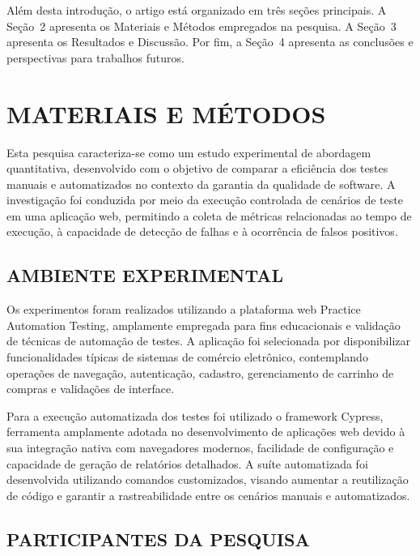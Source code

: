 \documentclass{UNESC}
\begin{document}
Além desta introdução, o artigo está organizado em três seções principais. A Seção~2 apresenta os Materiais e Métodos empregados na pesquisa. A Seção~3 apresenta os Resultados e Discussão. Por fim, a Seção~4 apresenta as conclusões e perspectivas para trabalhos futuros.

\section{MATERIAIS E MÉTODOS}
Esta pesquisa caracteriza-se como um estudo experimental de abordagem quantitativa, desenvolvido com o objetivo de comparar a eficiência dos testes manuais e automatizados no contexto da garantia da qualidade de software. A investigação foi conduzida por meio da execução controlada de cenários de teste em uma aplicação web, permitindo a coleta de métricas relacionadas ao tempo de execução, à capacidade de detecção de falhas e à ocorrência de falsos positivos.

\subsection{AMBIENTE EXPERIMENTAL}

Os experimentos foram realizados utilizando a plataforma web Practice Automation Testing, amplamente empregada para fins educacionais e validação de técnicas de automação de testes. A aplicação foi selecionada por disponibilizar funcionalidades típicas de sistemas de comércio eletrônico, contemplando operações de navegação, autenticação, cadastro, gerenciamento de carrinho de compras e validações de interface.

Para a execução automatizada dos testes foi utilizado o framework Cypress, ferramenta amplamente adotada no desenvolvimento de aplicações web devido à sua integração nativa com navegadores modernos, facilidade de configuração e capacidade de geração de relatórios detalhados. A suíte automatizada foi desenvolvida utilizando comandos customizados, visando aumentar a reutilização de código e garantir a rastreabilidade entre os cenários manuais e automatizados.

\subsection{PARTICIPANTES DA PESQUISA}
\end{document}
